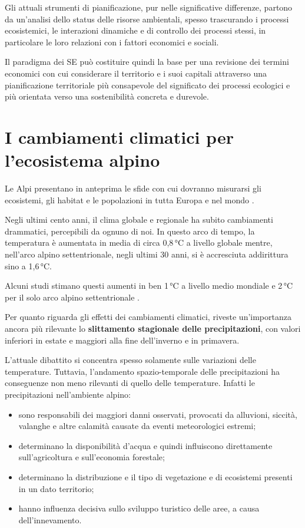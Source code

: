 \documentclass[14pt,a4paper]{article}
\begin{document}
	Gli attuali strumenti di pianificazione, pur nelle significative differenze, partono da un'analisi dello status delle risorse ambientali, spesso trascurando i processi ecosistemici, le interazioni dinamiche e di controllo dei processi stessi, in particolare le loro relazioni con i fattori economici e sociali. 
	
	Il paradigma dei SE può costituire quindi la base per una revisione dei termini economici con cui considerare il territorio e i suoi capitali attraverso una  pianificazione territoriale più consapevole del significato dei processi ecologici e più orientata verso una sostenibilità concreta e durevole.
	
	
	\section{I cambiamenti climatici per l'ecosistema alpino}
	
	Le Alpi presentano in anteprima le sfide con cui dovranno misurarsi gli ecosistemi, gli habitat e le popolazioni in tutta Europa e nel mondo \cite{LeAlpi}.
	
	Negli ultimi cento anni, il clima globale e regionale ha subito cambiamenti drammatici, percepibili da ognuno di noi. In questo arco di tempo, la temperatura è aumentata in media di circa 0,8\,°C a livello globale mentre, nell'arco alpino settentrionale, negli ultimi 30 anni, si è accresciuta addirittura sino a 1,6\,°C. 
	
	Alcuni studi stimano questi aumenti in ben 1\,°C a livello medio mondiale e 2\,°C per il solo arco alpino settentrionale \cite{LeAlpi}.
	
	Per quanto riguarda gli effetti dei cambiamenti climatici, riveste un'importanza ancora più rilevante lo \textbf{slittamento stagionale delle precipitazioni}, con valori inferiori in estate e maggiori alla fine dell'inverno e in primavera.
	
	L'attuale dibattito si concentra spesso solamente sulle variazioni delle temperature. Tuttavia, l'andamento spazio-temporale delle precipitazioni ha conseguenze non meno rilevanti di quello delle temperature. Infatti le precipitazioni nell'ambiente alpino:
		
	\begin{itemize}
		\item sono responsabili dei maggiori danni osservati, provocati da alluvioni, siccità, valanghe e altre calamità causate da eventi meteorologici estremi;
		\item determinano la disponibilità d'acqua e quindi influiscono direttamente sull'agricoltura e sull'economia forestale;
		\item determinano la distribuzione e il tipo di vegetazione e di ecosistemi presenti in un dato territorio;
		\item hanno influenza decisiva sullo sviluppo turistico delle aree, a causa dell'innevamento.
	\end{itemize}
	
\end{document}
